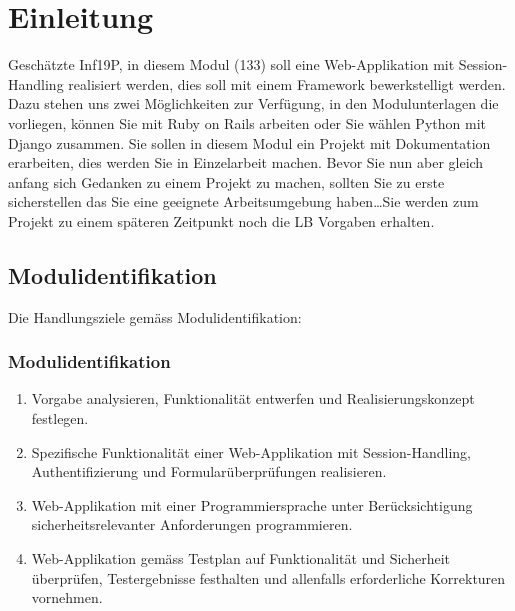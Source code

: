 \mode*

\section{Einleitung}
\label{sec:einleitung}

\begin{frame}[fragile]
    Geschätzte Inf19P, in diesem Modul (133) soll eine Web-Applikation mit Session-Handling realisiert werden, dies soll
    mit einem Framework bewerkstelligt werden.
    Dazu stehen uns zwei Möglichkeiten zur Verfügung, in den Modulunterlagen die vorliegen, können Sie mit Ruby on Rails arbeiten
    oder Sie wählen Python mit Django zusammen.
    Sie sollen in diesem Modul ein Projekt mit Dokumentation erarbeiten, dies werden Sie in Einzelarbeit machen.
    Bevor Sie nun aber gleich anfang sich Gedanken zu einem Projekt zu machen, sollten Sie zu erste sicherstellen das
    Sie eine geeignete Arbeitsumgebung haben\ldots\newline Sie werden zum Projekt zu einem späteren Zeitpunkt noch die LB Vorgaben erhalten.
\end{frame}


\subsection{Modulidentifikation}
\label{subsec:modulid}
Die Handlungsziele gemäss Modulidentifikation:
\begin{frame}[fragile]
    \frametitle<presentation>{Modulidentifikation}
    \begin{enumerate}
        \item Vorgabe analysieren, Funktionalität entwerfen und
        Realisierungskonzept festlegen.
        \item Spezifische Funktionalität einer Web-Applikation mit Session-Handling,
        Authentifizierung und Formularüberprüfungen realisieren.
        \item Web-Applikation mit einer Programmiersprache unter
        Berücksichtigung sicherheitsrelevanter Anforderungen
        programmieren.
        \item Web-Applikation gemäss Testplan auf Funktionalität und
        Sicherheit überprüfen, Testergebnisse festhalten und
        allenfalls erforderliche Korrekturen vornehmen.
    \end{enumerate}
\end{frame}


